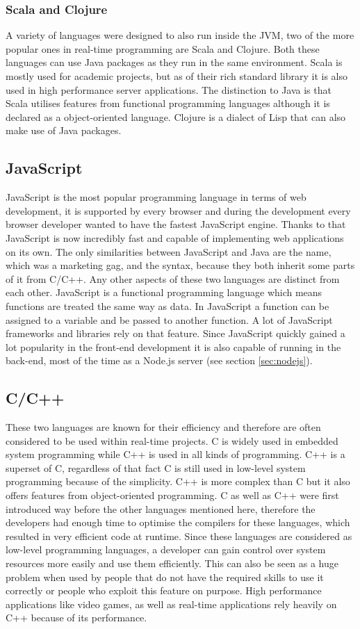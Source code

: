 \subsubsection{Scala and Clojure}
A variety of languages were designed to also run inside the JVM, two of the more popular ones in real-time programming are Scala and Clojure. Both these languages can use Java packages as they run in the same environment. Scala is mostly used for academic projects, but as of their rich standard library it is also used in high performance server applications. The distinction to Java is that Scala utilises features from functional programming languages although it is declared as a object-oriented language. Clojure is a dialect of Lisp that can also make use of Java packages.

\subsection{JavaScript}
JavaScript is the most popular programming language in terms of web development, it is supported by every browser and during the development every browser developer wanted to have the fastest JavaScript engine. Thanks to that JavaScript is now incredibly fast and capable of implementing web applications on its own. The only similarities between JavaScript and Java are the name, which was a marketing gag, and the syntax, because they both inherit some parts of it from C/C++. Any other aspects of these two languages are distinct from each other. JavaScript is a functional programming language which means functions are treated the same way as data. In JavaScript a function can be assigned to a variable and be passed to another function. A lot of JavaScript frameworks and libraries rely on that feature. Since JavaScript quickly gained a lot popularity in the front-end development it is also capable of running in the back-end, most of the time as a Node.js server (see section \vref{sec:nodejs}).

\subsection{C/C++}
These two languages are known for their efficiency and therefore are often considered to be used within real-time projects. C is widely used in embedded system programming while C++ is used in all kinds of programming. C++ is a superset of C, regardless of that fact C is still used in low-level system programming because of the simplicity. C++ is more complex than C but it also offers features from object-oriented programming. C as well as C++ were first introduced way before the other languages mentioned here, therefore the developers had enough time to optimise the compilers for these languages, which resulted in very efficient code at runtime. Since these languages are considered as low-level programming languages, a developer can gain control over system resources more easily and use them efficiently. This can also be seen as a huge problem when used by people that do not have the required skills to use it correctly or people who exploit this feature on purpose. High performance applications like video games, as well as real-time applications rely heavily on C++ because of its performance.

